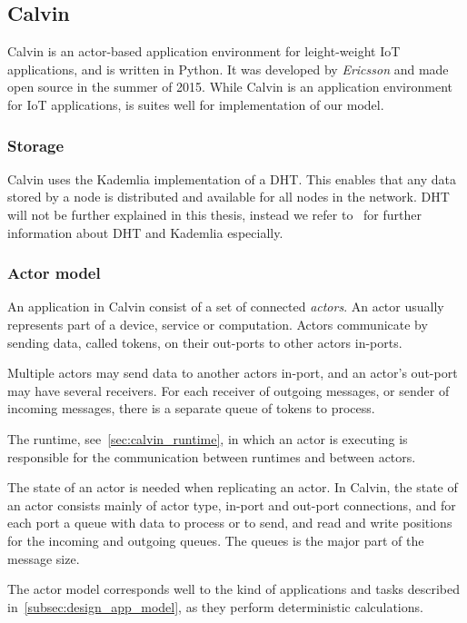 \documentclass{cslthse-msc}
\begin{document}
\subsection{Calvin} \label{subsec:design_calvin}
Calvin is an actor-based application environment for leight-weight IoT applications, and is written in Python. It was developed by \emph{Ericsson} and made open source in the summer of 2015. While Calvin is an application environment for IoT applications, is suites well for implementation of our model.

\subsubsection{Storage} \label{sec:calvin_storage}
Calvin uses the Kademlia implementation of a DHT. This enables that any data stored by a node is distributed and available for all nodes in the network. DHT will not be further explained in this thesis, instead we refer to~\cite{kademlia} for further information about DHT and Kademlia especially.

\subsubsection{Actor model} \label{sec:calvin_actor}
An application in Calvin consist of a set of connected \emph{actors}. An actor usually represents part of a device, service or computation. Actors communicate by sending data, called tokens, on their out-ports to other actors in-ports. 

Multiple actors may send data to another actors in-port, and an actor's out-port may have several receivers. For each receiver of outgoing messages, or sender of incoming messages, there is a separate queue of tokens to process.

The runtime, see~\cref{sec:calvin_runtime}, in which an actor is executing is responsible for the communication between runtimes and between actors.

The state of an actor is needed when replicating an actor. In Calvin, the state of an actor consists mainly of actor type, in-port and out-port connections, and for each port a queue with data to process or to send, and read and write positions for the incoming and outgoing queues. The queues is the major part of the message size.

The actor model corresponds well to the kind of applications and tasks described in~\cref{subsec:design_app_model}, as they perform deterministic calculations.
\end{document}
